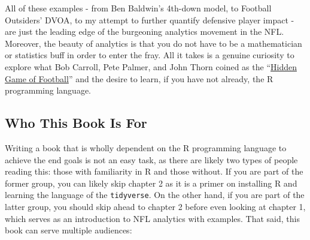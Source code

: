 \documentclass[
  letterpaper,
]{krantz}
\begin{document}
All of these examples - from Ben Baldwin's 4th-down model, to Football
Outsiders' DVOA, to my attempt to further quantify defensive player
impact - are just the leading edge of the burgeoning analytics movement
in the NFL. Moreover, the beauty of analytics is that you do not have to
be a mathematician or statistics buff in order to enter the fray. All it
takes is a genuine curiosity to explore what Bob Carroll, Pete Palmer,
and John Thorn coined as the ``\href{https://amzn.to/3y1GZTO}{Hidden
Game of Football}'' and the desire to learn, if you have not already,
the R programming language.

\hypertarget{who-this-book-is-for}{%
\subsection{Who This Book Is For}\label{who-this-book-is-for}}

Writing a book that is wholly dependent on the R programming language to
achieve the end goals is not an easy task, as there are likely two types
of people reading this: those with familiarity in R and those without.
If you are part of the former group, you can likely skip chapter 2 as it
is a primer on installing R and learning the language of the
\texttt{tidyverse}. On the other hand, if you are part of the latter
group, you should skip ahead to chapter 2 before even looking at chapter
1, which serves as an introduction to NFL analytics with examples. That
said, this book can serve multiple audiences:
\end{document}
